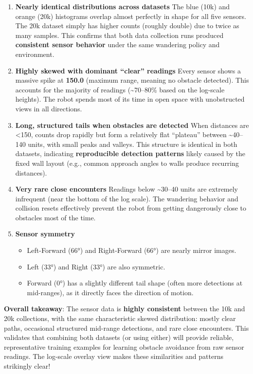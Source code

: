 \begin{enumerate}
\item \textbf{Nearly identical distributions across datasets}\newline
The blue (10k) and orange (20k) histograms overlap almost perfectly in shape for all five sensors. The 20k dataset simply has higher counts (roughly double) due to twice as many samples. This confirms that both data collection runs produced \textbf{consistent sensor behavior} under the same wandering policy and environment.
\item \textbf{Highly skewed with dominant ``clear'' readings}\newline
Every sensor shows a massive spike at \textbf{150.0} (maximum range, meaning no obstacle detected). This accounts for the majority of readings ({\textasciitilde}70--80\% based on the log-scale heights). The robot spends most of its time in open space with unobstructed views in all directions.
\item \textbf{Long, structured tails when obstacles are detected}\newline
When distances are \textless 150, counts drop rapidly but form a relatively flat ``plateau'' between {\textasciitilde}40--140 units, with small peaks and valleys. This structure is identical in both datasets, indicating \textbf{reproducible detection patterns} likely caused by the fixed wall layout (e.g., common approach angles to walls produce recurring distances).
\item \textbf{Very rare close encounters}\newline
Readings below {\textasciitilde}30--40 units are extremely infrequent (near the bottom of the log scale). The wandering behavior and collision resets effectively prevent the robot from getting dangerously close to obstacles most of the time.
\item \textbf{Sensor symmetry}

\begin{itemize}
\item Left-Forward (66°) and Right-Forward (66°) are nearly mirror images.
\item Left (33°) and Right (33°) are also symmetric.
\item Forward (0°) has a slightly different tail shape (often more detections at mid-ranges), as it directly faces the direction of motion.
\end{itemize}
\end{enumerate}

\textbf{Overall takeaway}:\newline
The sensor data is \textbf{highly consistent} between the 10k and 20k collections, with the same characteristic skewed distribution: mostly clear paths, occasional structured mid-range detections, and rare close encounters. This validates that combining both datasets (or using either) will provide reliable, representative training examples for learning obstacle avoidance from raw sensor readings. The log-scale overlay view makes these similarities and patterns strikingly clear!

